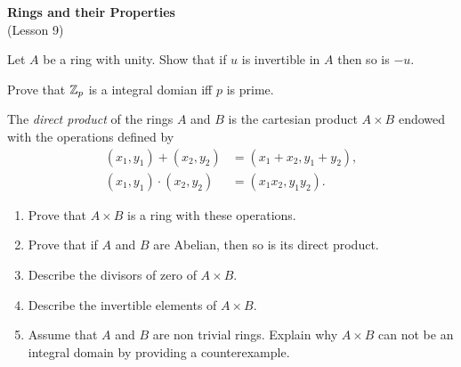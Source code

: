 \documentclass[
    11pt,a4paper,
]{exam}
\begin{document}
\def\contador{Problem Set 5}


\begin{center}
    {\bfseries\Large
        Rings and their Properties}\\
    (Lesson 9)
\end{center}


\begin{questions}

\question
Let $A$ be a ring with unity. Show that if $u$ is invertible in $A$ then so is $-u$.


\question
 Prove that   $\mathbb{Z}_p$ is a integral domian iff $p$ is prime.

  
\question
The \emph{direct product} of the rings $A$ and $B$ is the cartesian product $A\times B$ endowed with the operations defined by
\begin{align*}
(x_1,y_1) + (x_2,y_2) &= (x_1+x_2, y_1+y_2),
\\
(x_1,y_1) \cdot (x_2,y_2) &= (x_1 x_2, y_1 y_2).
\end{align*}
\begin{enumerate}[label=(\roman*)]
\item Prove that $A\times B$ is a ring with these operations.
\item Prove that if $A$ and $B$ are Abelian, then so is its direct product.
\item Describe the divisors of zero of $A\times B$.
\item Describe the invertible elements of $A\times B$.
\item Assume that $A$ and $B$ are non trivial rings. Explain why $A\times B$ can not be an integral domain by providing a counterexample.
\end{enumerate}





\end{questions}
\end{document}
